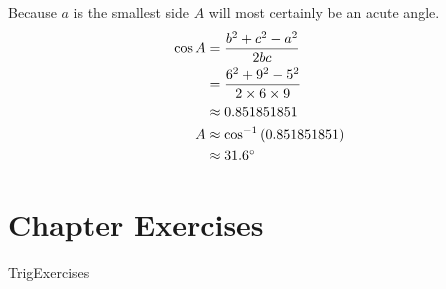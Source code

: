 Because $a$ is the smallest side $A$ will most certainly be an acute angle.
\begin{align*}\cos  A &  = \frac{b^{2} +c^{2} -a^{2}}{2 b c} \\
&  = \frac{6^{2} +9^{2} -5^{2}}{2 \times 6 \times 9} \\
&  \approx 0.851851851 \\
A &  \approx \cos ^{ -1} \left (0.851851851\right ) \\
&  \approx 31.6 \mbox{{\ensuremath{{}^\circ}}}
\end{align*}



\section{Chapter Exercises}
{TrigExercises}


